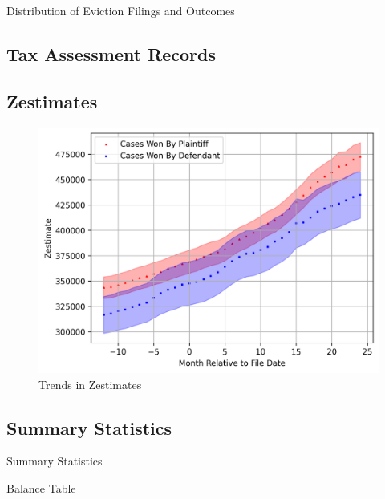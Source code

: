 \documentclass[12pt]{article}
\begin{document}
        \begin{table}[H]
            \centering
            
            \caption{Distribution of Eviction Filings and Outcomes}
            \label{tab:my_label}
        \end{table}
    
    \subsection{Tax Assessment Records}
    \subsection{Zestimates}
        \begin{figure}[H]
            \centering
            \includegraphics{output/summary_statistics/figures/trends_in_zestimates.png}
            \caption{Trends in Zestimates}
            \label{fig:my_label}
        \end{figure}

    \subsection{Summary Statistics}
         \begin{table}[H]
            \centering
            \small
            
            \caption{Summary Statistics}
            \label{tab:table_1}
        \end{table}
        \newpage
        \begin{table}[H]
            \centering
            \small
            
            \caption{Balance Table}
            \label{tab:my_label}
        \end{table}
\end{document}
